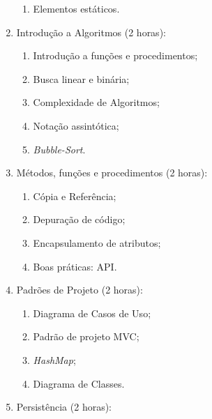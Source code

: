 \documentclass{article}
\begin{document}
\begin{enumerate}
\begin{samepage}
\begin{enumerate}
                \item Elementos estáticos.
            \end{enumerate}
        \end{samepage}
    \item Introdução a Algoritmos (2 horas):
        \begin{samepage}
            \begin{enumerate}
                \item Introdução a funções e procedimentos;
                \item Busca linear e binária;
                \item Complexidade de Algoritmos;
                \item Notação assintótica;
                \item \textit{Bubble-Sort}.
            \end{enumerate}
        \end{samepage}
    \item Métodos, funções e procedimentos (2 horas):
        \begin{samepage}
            \begin{enumerate}
                \item Cópia e Referência;
                \item Depuração de código;
                \item Encapsulamento de atributos;
                \item Boas práticas: API\@.
            \end{enumerate}
        \end{samepage}
    \item Padrões de Projeto (2 horas):
        \begin{samepage}
            \begin{enumerate}
                \item Diagrama de Casos de Uso;
                \item Padrão de projeto MVC\@;
                \item \textit{HashMap};
                \item Diagrama de Classes.
            \end{enumerate}
        \end{samepage}
    \item Persistência (2 horas):
        \begin{samepage}
            \begin{enumerate}

\end{enumerate}
\end{samepage}
\end{enumerate}
\end{document}
